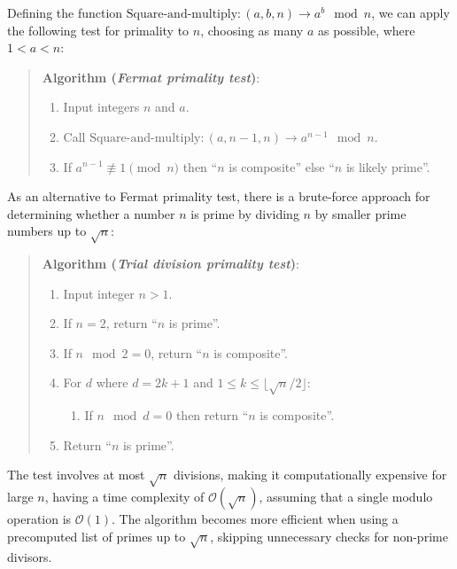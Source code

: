 \documentclass[
  letterpaper,
  DIV=11,
  numbers=noendperiod,
  oneside]{scrartcl}
\providecommand{\tightlist}{%
  \setlength{\itemsep}{0pt}\setlength{\parskip}{0pt}}\usepackage{longtable,booktabs,array}
\begin{document}
Defining the function
\(\text{Square-and-multiply}: (a, b, n) \to a^b \mod n\), we can apply
the following test for primality to \(n\), choosing as many \(a\) as
possible, where \(1 < a < n\):

\begin{quote}
\textbf{Algorithm (\emph{Fermat primality test})}:

\begin{enumerate}
\def\labelenumi{\arabic{enumi}.}
\item
  Input integers \(n\) and \(a\).
\item
  Call \(\text{Square-and-multiply}: (a, n-1, n) \to a^{n-1} \mod n\).
\item
  If \(a^{n-1} \not\equiv 1 \pmod{n}\) then ``\(n\) is composite'' else
  ``\(n\) is likely prime''.
\end{enumerate}
\end{quote}

As an alternative to Fermat primality test, there is a brute-force
approach for determining whether a number \(n\) is prime by dividing
\(n\) by smaller prime numbers up to \(\sqrt{n}\):

\begin{quote}
\textbf{Algorithm (\emph{Trial division primality test})}:

\begin{enumerate}
\def\labelenumi{\arabic{enumi}.}
\item
  Input integer \(n > 1\).
\item
  If \(n = 2\), return ``\(n\) is prime''.
\item
  If \(n \mod 2 = 0\), return ``\(n\) is composite''.
\item
  For \(d\) where \(d = 2k + 1\) and
  \(1 \leq k \leq \lfloor \sqrt{n}/2 \rfloor\):

  \begin{enumerate}
  \def\labelenumii{\arabic{enumii}.}
  \tightlist
  \item
    If \(n \mod d = 0\) then return ``\(n\) is composite''.
  \end{enumerate}
\item
  Return ``\(n\) is prime''.
\end{enumerate}
\end{quote}

The test involves at most \(\sqrt{n}\) divisions, making it
computationally expensive for large \(n\), having a time complexity of
\(\mathcal{O}(\sqrt{n})\), assuming that a single modulo operation is
\(\mathcal{O}(1)\). The algorithm becomes more efficient when using a
precomputed list of primes up to \(\sqrt{n}\), skipping unnecessary
checks for non-prime divisors.
\end{document}
